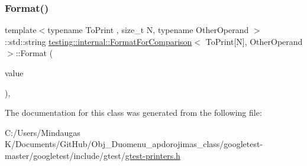 \mbox{\label{classtesting_1_1internal_1_1_format_for_comparison_3_01_to_print[_n]_00_01_other_operand_01_4_a76c526461c8fa7df75f7b32ab889b9e0}} 
\subsubsection{\texorpdfstring{Format()}{Format()}\hspace{0.1cm}{\footnotesize\ttfamily [3/3]}}
{\footnotesize\ttfamily template$<$typename To\+Print , size\+\_\+t N, typename Other\+Operand $>$ \\
\+::std\+::string \mbox{\hyperlink{classtesting_1_1internal_1_1_format_for_comparison}{testing\+::internal\+::\+Format\+For\+Comparison}}$<$ To\+Print\mbox{[}N\mbox{]}, Other\+Operand $>$\+::Format (\begin{DoxyParamCaption}\item[{const To\+Print $\ast$}]{value }\end{DoxyParamCaption})\hspace{0.3cm}{\ttfamily [inline]}, {\ttfamily [static]}}



The documentation for this class was generated from the following file\+:\begin{DoxyCompactItemize}
\item 
C\+:/\+Users/\+Mindaugas K/\+Documents/\+Git\+Hub/\+Obj\+\_\+\+Duomenu\+\_\+apdorojimas\+\_\+class/googletest-\/master/googletest/include/gtest/\mbox{\hyperlink{googletest-master_2googletest_2include_2gtest_2gtest-printers_8h}{gtest-\/printers.\+h}}\end{DoxyCompactItemize}
